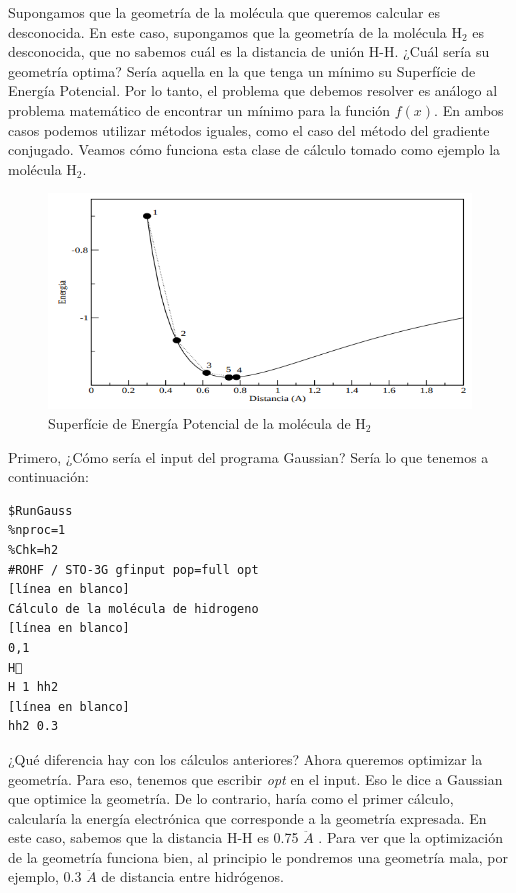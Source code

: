 \documentclass{tufte-book}
\begin{document}
Supongamos que la geometría de la molécula que queremos calcular es desconocida. 
En este caso, supongamos que la geometría de la molécula H$_2$  es desconocida, 
que no sabemos cuál es la distancia de unión H-H. ¿Cuál sería su geometría optima? 
Sería aquella en la que tenga un mínimo su Superfície de Energía Potencial. 
Por lo tanto, el problema que debemos resolver es análogo al problema matemático
de encontrar un mínimo para la función $f(x)$. En ambos casos podemos utilizar 
métodos iguales, como el caso del método del gradiente conjugado. Veamos cómo
funciona esta clase de cálculo tomado como ejemplo la molécula H$_2$.

\begin{figure}
\centering
\includegraphics[scale=0.7]{PES_opt_H2.png}
\caption{Superfície de Energía Potencial de la molécula de H$_2$ }
\end{figure}

Primero, ¿Cómo sería el input del programa Gaussian? Sería lo que tenemos a continuación:

\begin{verbatim}
$RunGauss
%nproc=1
%Chk=h2
#ROHF / STO-3G gfinput pop=full opt
[línea en blanco]
Cálculo de la molécula de hidrogeno 
[línea en blanco] 
0,1
H
H 1 hh2
[línea en blanco]
hh2 0.3
\end{verbatim}

¿Qué diferencia hay con los cálculos anteriores? Ahora queremos optimizar la geometría. Para eso, tenemos que escribir \textit{opt} en el input. Eso le dice a Gaussian que optimice la geometría. De lo contrario, haría como el primer cálculo, calcularía la energía electrónica que corresponde a la geometría expresada. En este caso, sabemos que la distancia H-H es 0.75 $\ddot{A}$ . Para ver que la optimización de la geometría funciona bien, al principio le pondremos una geometría mala, por ejemplo, 0.3 $\ddot{A}$ de distancia entre hidrógenos. 
\end{document}
